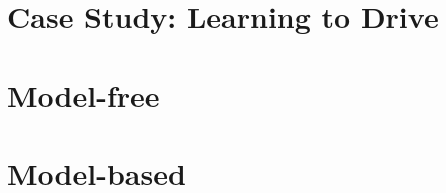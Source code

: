 \setcounter{mtc}{-1}
\adjustmtc




\part{Case Study: Learning to Drive}




\part{Model-free}




\part{Model-based}




